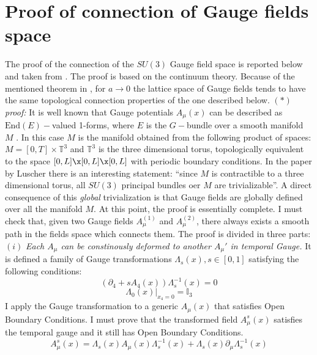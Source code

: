 \documentclass[english, LaM, oneside, noexaminfo]{sapthesis}
\newcommand{\obc}{Open Boundary Conditions}
\begin{document}
\section{Proof of connection of Gauge fields space}\label{app:connection}
\noindent
The proof of the connection of the $SU(3)$ Gauge field space is reported below and taken from \cite{OBC_top}.
The proof is based on the continuum theory.
Because of the mentioned theorem in \cite{Topology-WilsonFlow-HMC}, for $a \rightarrow 0$ the lattice space of Gauge fields tends to have the same topological connection properties of the one described below.
\newline\newline
\textit{$(*)$ proof:}
\newline
It is well known that Gauge potentials $A_\mu (x)$ can be described as $\text{End}(E)-$valued 1-forms, where $E$ is the $G-$bundle over a smooth manifold $M$ \cite{Baez}.
In this case $M$ is the manifold obtained from the following product of spaces: $M = [0,T]\times \mathbb{T}^3$ and $\mathbb{T}^3$ is the three dimensional torus, topologically equivalent to the space $[0,L]\x[0,L]\x[0,L]$ with periodic boundary conditions.
\newline
In the paper by Luscher \cite{OBC_top} there is an interesting statement: ``since $M$ is contractible to a three dimensional torus, all $SU(3)$ principal bundles oer $M$ are trivializable''.
A direct consequence of this {\it global} trivialization is that Gauge fields are globally defined over all the manifold $M$.
\newline
At this point, the proof is essentially complete.
I must check that, given two Gauge fields $A_\mu^{(1)}$ and $A_\mu^{(2)}$, there always exists a smooth path in the fields space which connects them.
The proof is divided in three parts:
\newline
\newline
$(i)$ \textit{Each $A_\mu$ can be constinously deformed to another ${A}_\mu'$ in temporal Gauge.}
\newline
It is defined a family of Gauge transformations $\Lambda_s (x), s\in [0,1]$ satisfying the following conditions:
$$\left(\partial_4 + sA_4 (x)\right) \Lambda_s^{-1} (x) = 0$$
$$\Lambda_0 (x) \big|_{x_4 = 0} = \mathbb{I}_3$$
I apply the Gauge transformation to a generic $A_\mu (x)$ that satisfies \obc.
I must prove that the transformed field $A_\mu^s (x)$ satisfies the temporal gauge and it still has \obc\space.
\begin{equation*}
    A_\mu^s (x) = \Lambda_s (x) A_\mu (x) \Lambda_s^{-1} (x) + \Lambda_s (x) \partial_\mu \Lambda_s^{-1} (x) 
\end{equation*}
\end{document}
